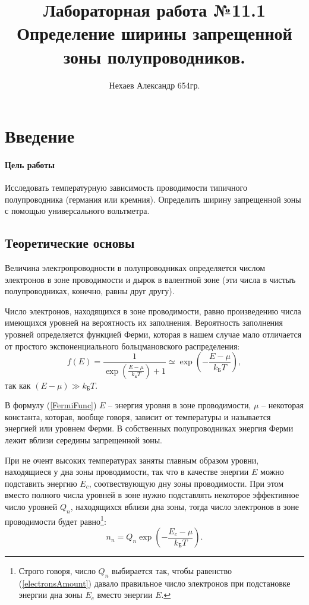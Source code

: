 \documentclass[a4paper, 12pt]{article}
\begin{document}
	\title{Лабораторная работа №11.1\\Определение ширины запрещенной зоны полупроводников.}
	\author{Нехаев Александр 654гр.}
	\maketitle
	\tableofcontents
	\section{Введение}
	\paragraph{Цель работы}
	Исследовать температурную зависимость проводимости типичного полупроводника (германия или кремния). Определить ширину запрещенной зоны с помощью универсального вольтметра.
	\subsection{Теоретические основы}
	Величина электропроводности в полупроводниках определяется числом электронов в зоне проводимости и дырок в валентной зоне (эти числа в чистыъ полупроводниках, конечно, равны друг другу).

	Число электронов, находящихся в зоне проводимости, равно произведению числа имеющихся уровней на вероятность их заполнения. Вероятность заполнения уровней определяется функцией Ферми, которая в нашем случае мало отличается от простого экспоненциального больцмановского распределения:
	\begin{equation}
		f(E) = \frac{1}{\exp\left(\frac{E-\mu}{k_{\text{Б}}T}\right)+1}\simeq\exp{\left(-\frac{E-\mu}{k_{\text{Б}}T}\right)},
		\label{FermiFunc}
	\end{equation}
	так как $(E-\mu)\gg k_{\text{Б}}T$.

	В формулу (\ref{FermiFunc}) $E$ -- энергия уровня в зоне проводимости, $\mu$ -- некоторая константа, которая, вообще говоря, зависит от температуры и называется энергией или уровнем Ферми. В собственных полупроводниках энергия Ферми лежит вблизи середины запрещенной зоны.

	При не очент высоких температурах заняты главным образом уровни, находящиеся у дна зоны проводимости, так что в качестве энергии $E$ можно подставить энергию $E_c$, соотвествующую дну зоны проводимости. При этом вместо полного числа уровней в зоне нужно подставлять некоторое эффективное число уровней $Q_n$, находящихся вблизи дна зоны, тогда число электронов в зоне проводимости будет равно\footnote{Строго говоря, число $Q_n$ выбирается так, чтобы равенство (\ref{electronsAmount}) давало правильное число электронов при подстановке энергии дна зоны $E_c$ вместо энергии $E$.}:
	\begin{equation}
		n_n=Q_n\exp{\left(-\frac{E_c-\mu}{k_{\text{Б}}T}\right)}.
		\label{electronsAmount}
	\end{equation}
\end{document}
